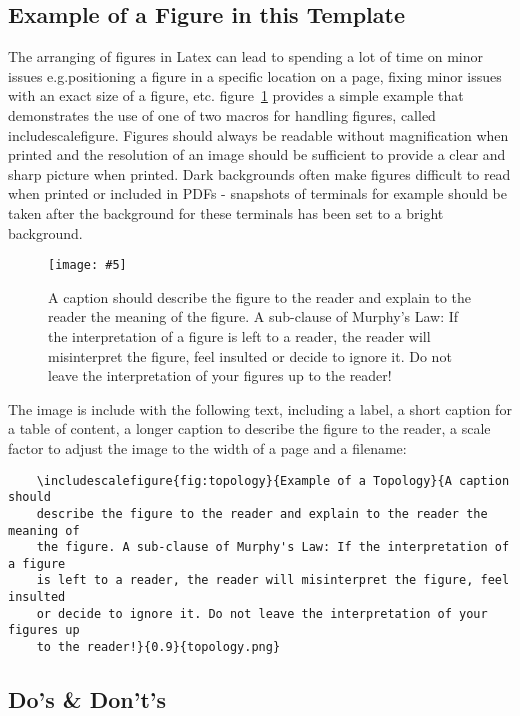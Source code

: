\documentclass{article}
\newcommand{\includescalefigure}[5]{
\begin{figure}[htb]
\centering
\texttt{[image: \#5]}
\captionsetup{width=.8\linewidth} 
\caption[#2]{#3}
\label{#1}
\end{figure}
}
\begin{document}
\subsection*{Example of a Figure in this Template}
\label{sec:figures}

The arranging of figures in Latex can lead to spending a lot of time on minor issues e.g.positioning a figure in a specific location on a page, fixing minor issues with an exact size of a figure, etc. figure~\ref{fig:topology} provides a simple example that demonstrates the use of one of two macros for handling figures, called  includescalefigure. Figures should always be readable without magnification when printed and the resolution of an image should be sufficient to provide a clear and sharp picture when printed. Dark backgrounds often make figures difficult to read when printed or included in PDFs - snapshots of terminals for example should be taken after the background for these terminals has been set to a bright background.

\includescalefigure{fig:topology}{Example of a Topology}{A caption should describe the figure to the reader and explain to the reader the meaning of the figure. A sub-clause of Murphy's Law: If the interpretation of a figure is left to a reader, the reader will misinterpret the figure, feel insulted or decide to ignore it. Do not leave the interpretation of your figures up to the reader!}{0.9}{topology.png}

The image is include with the following text, including a label, a short caption for a table of content, a longer caption to describe the figure to the reader, a scale factor to adjust the image to the width of a page and a filename: 
\begin{verbatim}
	\includescalefigure{fig:topology}{Example of a Topology}{A caption should
	describe the figure to the reader and explain to the reader the meaning of
	the figure. A sub-clause of Murphy's Law: If the interpretation of a figure
	is left to a reader, the reader will misinterpret the figure, feel insulted 
	or decide to ignore it. Do not leave the interpretation of your figures up 
	to the reader!}{0.9}{topology.png}
\end{verbatim}

\subsection*{Do's \& Don't's}
\label{sec:DosAndDonts}
\end{document}
